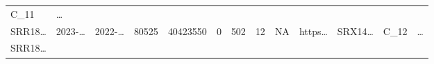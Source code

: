 \documentclass[
]{article}
\begin{document}
\begin{longtable}[]{@{}lllllllllllll@{}}
\begin{minipage}[t]{0.08\columnwidth}
C\_11\strut
\end{minipage} & \begin{minipage}[t]{0.02\columnwidth}\raggedright
\ldots{}\strut
\end{minipage}\tabularnewline
\begin{minipage}[t]{0.05\columnwidth}\raggedright
SRR18\ldots{}\strut
\end{minipage} & \begin{minipage}[t]{0.05\columnwidth}\raggedright
2023-\ldots{}\strut
\end{minipage} & \begin{minipage}[t]{0.05\columnwidth}\raggedright
2022-\ldots{}\strut
\end{minipage} & \begin{minipage}[t]{0.04\columnwidth}\raggedright
80525\strut
\end{minipage} & \begin{minipage}[t]{0.05\columnwidth}\raggedright
40423550\strut
\end{minipage} & \begin{minipage}[t]{0.05\columnwidth}\raggedright
0\strut
\end{minipage} & \begin{minipage}[t]{0.05\columnwidth}\raggedright
502\strut
\end{minipage} & \begin{minipage}[t]{0.05\columnwidth}\raggedright
12\strut
\end{minipage} & \begin{minipage}[t]{0.05\columnwidth}\raggedright
NA\strut
\end{minipage} & \begin{minipage}[t]{0.05\columnwidth}\raggedright
https\ldots{}\strut
\end{minipage} & \begin{minipage}[t]{0.05\columnwidth}\raggedright
SRX14\ldots{}\strut
\end{minipage} & \begin{minipage}[t]{0.08\columnwidth}\raggedright
C\_12\strut
\end{minipage} & \begin{minipage}[t]{0.02\columnwidth}\raggedright
\ldots{}\strut
\end{minipage}\tabularnewline
\begin{minipage}[t]{0.05\columnwidth}\raggedright
SRR18\ldots{}\strut
\end{minipage} & \begin{minipage}[t]{0.05\columnwidth}\raggedright

\end{minipage}
\end{longtable}
\end{document}
